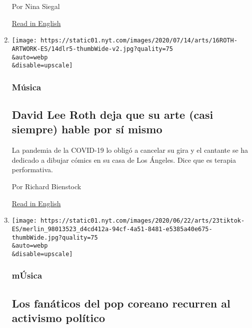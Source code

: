 \begin{enumerate}
  Por Nina Siegal

  \href{https://www.nytimes.com/2020/07/28/arts/design/vincent-van-gogh-tree-roots.html}{Read
  in English}
\item
  \href{/es/2020/07/16/espanol/cultura/david-lee-roth-van-halen-pinturas.html}{}

  \texttt{[image: https://static01.nyt.com/images/2020/07/14/arts/16ROTH-ARTWORK-ES/14dlr5-thumbWide-v2.jpg?quality=75\\\&auto=webp\\\&disable=upscale]}

  \hypertarget{muxfasica}{%
  \subsubsection{Música}\label{muxfasica}}

  \hypertarget{david-lee-roth-deja-que-su-arte-casi-siempre-hable-por-suxed-mismo}{%
  \subsection{David Lee Roth deja que su arte (casi siempre) hable por
  sí
  mismo}\label{david-lee-roth-deja-que-su-arte-casi-siempre-hable-por-suxed-mismo}}

  La pandemia de la COVID-19 lo obligó a cancelar su gira y el cantante
  se ha dedicado a dibujar cómics en su casa de Los Ángeles. Dice que es
  terapia performativa.

  Por Richard Bienstock

  \href{https://www.nytimes.com/2020/07/13/arts/music/david-lee-roth-art.html}{Read
  in English}
\item
  \href{/es/2020/06/23/espanol/cultura/kpopers-trump-politica.html}{}

  \texttt{[image: https://static01.nyt.com/images/2020/06/22/arts/23tiktok-ES/merlin\_98013523\_d4cd412a-94cf-4a51-8481-e5385a40e675-thumbWide.jpg?quality=75\\\&auto=webp\\\&disable=upscale]}

  \hypertarget{muxfasica-1}{%
  \subsubsection{mÚsica}\label{muxfasica-1}}

  \hypertarget{los-fanuxe1ticos-del-pop-coreano-recurren-al-activismo-poluxedtico}{%
  \subsection{Los fanáticos del pop coreano recurren al activismo
  político}\label{los-fanuxe1ticos-del-pop-coreano-recurren-al-activismo-poluxedtico}}


\end{enumerate}
